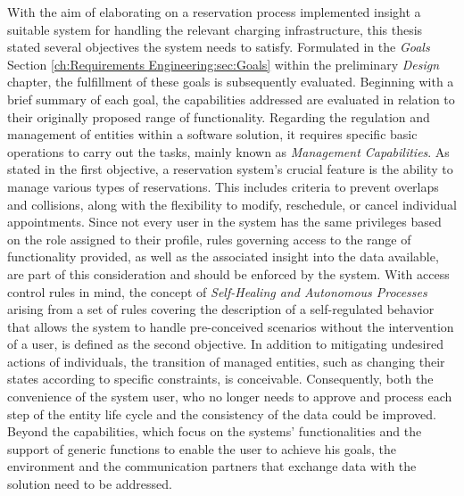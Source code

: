 With the aim of elaborating on a reservation process implemented insight a suitable system for handling the relevant charging infrastructure, this thesis stated several objectives the system needs to satisfy. 
Formulated in the \textit{Goals} Section \ref{ch:Requirements Engineering:sec:Goals} within the preliminary \textit{Design} chapter, the fulfillment of these goals is subsequently evaluated.
Beginning with a brief summary of each goal, the capabilities addressed are evaluated in relation to their originally proposed range of functionality.
Regarding the regulation and management of entities within a software solution, it requires specific basic operations to carry out the tasks, mainly known as \textit{Management Capabilities}.
As stated in the first objective, a reservation system's crucial feature is the ability to manage various types of reservations. This includes criteria to prevent overlaps and collisions, along with the flexibility to modify, reschedule, or cancel individual appointments.
Since not every user in the system has the same privileges based on the role assigned to their profile, rules governing access to the range of functionality provided, as well as the associated insight into the data available, are part of this consideration and should be enforced by the system.
With access control rules in mind, the concept of \textit{Self-Healing and Autonomous Processes} arising from a set of rules covering the description of a self-regulated behavior that allows the system to handle pre-conceived scenarios without the intervention of a user, is defined as the second objective. 
In addition to mitigating undesired actions of individuals, the transition of managed entities, such as changing their states according to specific constraints, is conceivable.
Consequently, both the convenience of the system user, who no longer needs to approve and process each step of the entity life cycle and the consistency of the data could be improved.
Beyond the capabilities, which focus on the systems' functionalities and the support of generic functions to enable the user to achieve his goals, the environment and the communication partners that exchange data with the solution need to be addressed.
